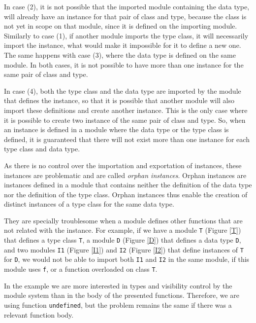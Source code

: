 \documentclass[msc]{ppgccufmg}
\begin{document}
In case (2), it is not possible that the imported module containing the data type, will already have an instance for that pair of class and type, because the class is not yet in scope on that module, since it is defined on the importing module.
Similarly to case (1), if another module imports the type class, it will necessarily import the instance, what would make it impossible for it to define a new one.
The same happens with case (3), where the data type is defined on the same module.
In both cases, it is not possible to have more than one instance for the same pair of class and type.

In case (4), both the type class and the data type are imported by the module that defines the instance, so that it is possible that another module will also import these definitions and create another instance.
This is the only case where it is possible to create two instance of the same pair of class and type.
So, when an instance is defined in a module where the data type or the type class is defined, it is guaranteed that there will not exist more than one instance for each type class and data type.

As there is no control over the importation and exportation of instances, these instances are problematic and are called \emph{orphan instances}.
Orphan instances are instances defined in a module that contains neither the definition of the data type nor the definition of the type class.
Orphan instances thus enable the creation of distinct instances of a type class for the same data type.

They are specially troublesome when a module defines other functions that are
not related with the instance.  For example, if we have a module \texttt{T}
(Figure \ref{T}) that defines a type class \texttt{T}, a module \texttt{D} (Figure \ref{D}) that defines a data
type \texttt{D}, and two modules \texttt{I1} (Figure \ref{I1}) and
\texttt{I2} (Figure \ref{I2}) that define
instances of \texttt{T} for \texttt{D}, we would not be able to import both
\texttt{I1} and \texttt{I2} in the same
module, if this module uses \texttt{f}, or a function overloaded on
  class \texttt{T}.

In the example we are more interested in types and visibility control
by the module system than in the body of the presented functions.
Therefore, we are using function \texttt{undefined}, but the problem
remains the same if there was a relevant function body.
\end{document}
